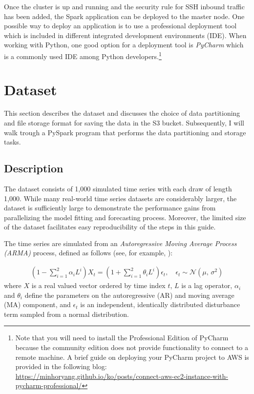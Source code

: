 \documentclass[11pt]{article}
\renewcommand{\cite}{\citet}
\begin{document}
Once the cluster is up and running and the security rule for SSH inbound traffic has been added, the Spark application can be deployed to the master node. One possible way to deploy an application is to use a professional deployment tool which is included in different integrated development environments (IDE). When working with Python, one good option for a deployment tool is \emph{PyCharm} which is a commonly used IDE among Python developers.\footnote{Note that you will need to install the Professional Edition of PyCharm because the community edition does not provide functionality to connect to a remote machine. A brief guide on deploying your PyCharm project to AWS is provided in the following blog: \url{https://minhoryang.github.io/ko/posts/connect-aws-ec2-instance-with-pycharm-professional/}} 





\section{Dataset}
\label{sec:dataset}

This section describes the dataset and discusses the choice of data partitioning and file storage format for saving the data in the S3 bucket. Subsequently, I will walk trough a PySpark program that performs the data partitioning and storage tasks.  

\subsection{Description}
\label{sec:dataset_description}

The dataset consists of 1,000 simulated time series with each draw of length 1,000. While many real-world time series datasets are considerably larger, the dataset is sufficiently large to demonstrate the performance gains from parallelizing the model fitting and forecasting process. Moreover, the limited size of the dataset facilitates easy reproducibility of the steps in this guide. 

The time series are simulated from an \emph{Autoregressive Moving Average Process (ARMA)} process, defined as follows (see, for example, \cite{Hamilton1994}):

\begin{equation} \label{eq1}
\begin{split}
\left(1-\sum_{i=1}^2 \alpha_iL^i\right)X_t = \left(1+\sum_{i=1}^2 \theta_iL^i\right)\epsilon_t, \quad \epsilon_t \sim \mathcal{N}(\mu,\,\sigma^{2})
\end{split}
\end{equation}
where $X$ is a real valued vector ordered by time index $t$, $L$ is a lag operator, $\alpha_i$ and $\theta_i$ define the parameters on the autoregressive (AR) and moving average (MA) component, and $\epsilon_t$ is an independent, identically distributed disturbance term sampled from a normal distribution. 
\end{document}
